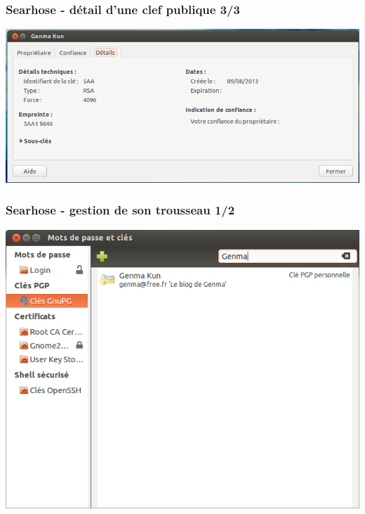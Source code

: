 \documentclass{beamer}
\begin{document}
\begin{frame}
\frametitle{Searhose - détail d'une clef publique 3/3}
\begin{center}
\includegraphics[scale=0.3] {./images/Seahorse_chercherclef06.png}
\end{center}
\end{frame}

\begin{frame}
\frametitle{Searhose - gestion de son trousseau 1/2}
\begin{center}
\includegraphics[scale=0.3] {./images/Seahorse_recherche_clef_contact.png}
\end{center}
\end{frame}
\end{document}
